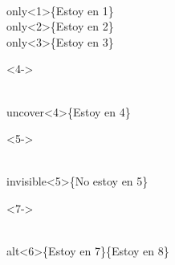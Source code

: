 \documentclass[11pt]{beamer}
\begin{document}
\begin{frame}

\begin{block}{}\scriptsize
\begin{semiverbatim}\\only<1>\{Estoy en 1\}\\only<2>\{Estoy en 2\}\\only<3>\{Estoy en 3\}
\end{semiverbatim}
\end{block}




\begin{block}<4->{}\scriptsize
\begin{semiverbatim}\\uncover<4>\{Estoy en 4\}
\end{semiverbatim}
\end{block}



\begin{block}<5->{}\scriptsize
\begin{semiverbatim}\\invisible<5>\{No estoy en 5\}
\end{semiverbatim}
\end{block}

\begin{block}<7->{}\scriptsize
\begin{semiverbatim}\\alt<6>\{Estoy en 7\}\{Estoy en 8\}
\end{semiverbatim}
\end{block}











\end{frame}
\end{document}
